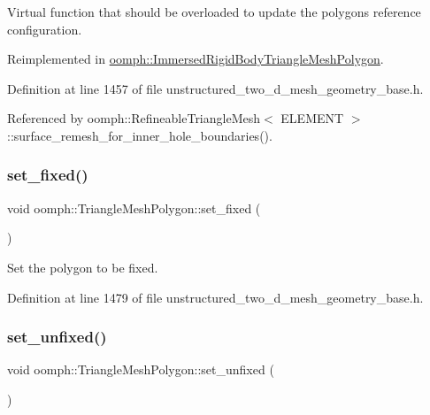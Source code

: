 Virtual function that should be overloaded to update the polygons reference configuration. 



Reimplemented in \hyperlink{classoomph_1_1ImmersedRigidBodyTriangleMeshPolygon_a784cda6e03ad1a083de8b03d14102876}{oomph\+::\+Immersed\+Rigid\+Body\+Triangle\+Mesh\+Polygon}.



Definition at line 1457 of file unstructured\+\_\+two\+\_\+d\+\_\+mesh\+\_\+geometry\+\_\+base.\+h.



Referenced by oomph\+::\+Refineable\+Triangle\+Mesh$<$ E\+L\+E\+M\+E\+N\+T $>$\+::surface\+\_\+remesh\+\_\+for\+\_\+inner\+\_\+hole\+\_\+boundaries().

\mbox{\label{classoomph_1_1TriangleMeshPolygon_a359ed1b0c4a0dfd06572207a1d21f327}} 
\subsubsection{\texorpdfstring{set\+\_\+fixed()}{set\_fixed()}}
{\footnotesize\ttfamily void oomph\+::\+Triangle\+Mesh\+Polygon\+::set\+\_\+fixed (\begin{DoxyParamCaption}{ }\end{DoxyParamCaption})\hspace{0.3cm}{\ttfamily [inline]}}



Set the polygon to be fixed. 



Definition at line 1479 of file unstructured\+\_\+two\+\_\+d\+\_\+mesh\+\_\+geometry\+\_\+base.\+h.

\mbox{\label{classoomph_1_1TriangleMeshPolygon_a850096fb1d02794a3103102341db4ff8}} 
\subsubsection{\texorpdfstring{set\+\_\+unfixed()}{set\_unfixed()}}
{\footnotesize\ttfamily void oomph\+::\+Triangle\+Mesh\+Polygon\+::set\+\_\+unfixed (\begin{DoxyParamCaption}{ }\end{DoxyParamCaption})\hspace{0.3cm}{\ttfamily [inline]}}



